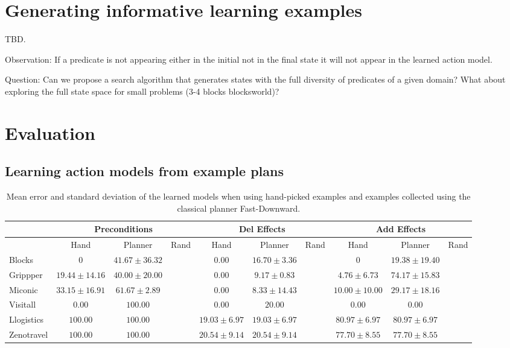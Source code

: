\documentclass[letterpaper]{article} %
\begin{document}
\section{Generating informative learning examples}
TBD.

Observation: If a predicate is not appearing either in the initial not in the final state it will not appear in the learned action model.

Question: Can we propose a search algorithm that generates states with the full diversity of predicates of a given domain? What about exploring the full state space for small problems (3-4 blocks blocksworld)?


\section{Evaluation}

\subsection{Learning action models from example plans}
\begin{table*}[!hbt]
\begin{footnotesize}
\begin{tabular}{l||c|c|c||c|c|c||c|c|c}
 & \multicolumn{3}{c||}{Preconditions} & \multicolumn{3}{c||}{Del Effects} & \multicolumn{3}{c}{Add Effects} \\\hline
 & Hand & Planner & Rand & Hand & Planner & Rand & Hand & Planner & Rand \\\hline
Blocks &  $0$ & $41.67\pm 36.32$ & & $0.00$ & $16.70\pm 3.36$ & & $0$ & $19.38\pm 19.40$&\\
Grippper & $19.44\pm 14.16$ & $40.00\pm 20.00$ & & $0.00$ & $9.17\pm 0.83$ & & $4.76\pm 6.73$ & $74.17\pm 15.83$&\\
Miconic & $33.15\pm 16.91$ & $61.67\pm 2.89$ & & $0.00$ & $8.33\pm 14.43$ & & $10.00\pm 10.00$ & $29.17\pm 18.16$&\\
Visitall & $0.00$ & $100.00$ & & $0.00$ & $20.00$ & & $0.00$ & $0.00$&\\
Llogistics & $100.00$& $100.00$ & & $19.03\pm 6.97$ & $19.03\pm 6.97$ & & $80.97\pm6.97$& $80.97\pm6.97$&\\
Zenotravel & $100.00$& $100.00$ & & $20.54\pm 9.14$ & $20.54\pm 9.14$ & & $77.70\pm 8.55$ &$77.70\pm 8.55$ &

\end{tabular}
\end{footnotesize}
\caption{\small Mean error and standard deviation of the learned models when using hand-picked examples and examples collected using the classical planner Fast-Downward.}
  \label{tab:eplans}
\end{table*}
\end{document}
